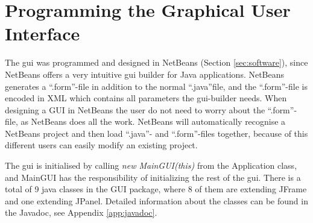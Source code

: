 \section{Programming the Graphical User Interface}
\label{secr:proggui}
The \acrshort{gui} was programmed and designed in NetBeans (Section \ref{sec:software}), since NetBeans offers a very intuitive \acrshort{gui} builder for Java applications. NetBeans generates a ``.form''-file in addition to the normal ``.java''file, and the ``.form''-file is encoded in XML which contains all parameters the \acrshort{gui}-builder needs. When designing a GUI in NetBeans the user do not need to worry about the ``.form''-file, as NetBeans does all the work. NetBeans will automatically recognise a NetBeans project and then load ``.java''- and ``.form''-files together, because of this different users can easily modify an existing project.

The \acrshort{gui} is initialised by calling \textit{new MainGUI(this)} from the Application class, and MainGUI has the responsibility of initializing the rest of the \acrshort{gui}. There is a total of 9 java classes in the GUI package, where 8 of them are extending JFrame and one extending JPanel. Detailed information about the classes can be found in the Javadoc, see Appendix \ref{app:javadoc}.